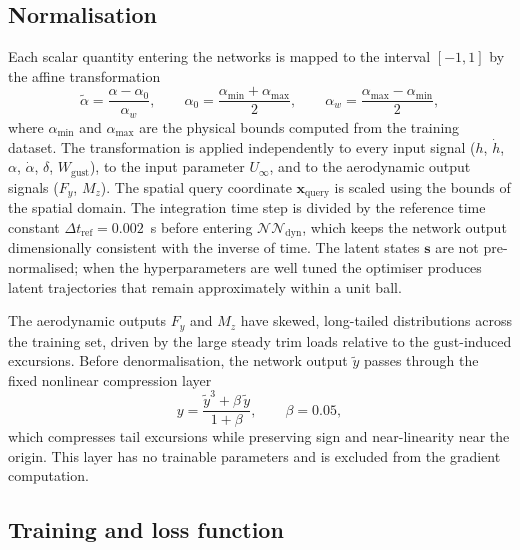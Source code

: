
\subsection{Normalisation}

Each scalar quantity entering the networks is mapped to the interval $[-1,1]$ by the
affine transformation
\begin{equation}
\tilde{\alpha} = \frac{\alpha - \alpha_0}{\alpha_w}, \qquad
\alpha_0 = \frac{\alpha_{\min}+\alpha_{\max}}{2}, \qquad
\alpha_w  = \frac{\alpha_{\max}-\alpha_{\min}}{2},
\label{eq:norm_affine}
\end{equation}
where $\alpha_{\min}$ and $\alpha_{\max}$ are the physical bounds computed from the training
dataset. The transformation is applied independently to every input signal ($h$, $\dot{h}$,
$\alpha$, $\dot{\alpha}$, $\delta$, $W_\mathrm{gust}$), to the input parameter $U_\infty$,
and to the aerodynamic output signals ($F_y$, $M_z$). The spatial query coordinate
$\mathbf{x}_\mathrm{query}$ is scaled using the bounds of the spatial domain. The
integration time step is divided by the reference time constant
$\Delta t_\mathrm{ref} = 0.002$~s before entering $\mathcal{NN}_\mathrm{dyn}$, which keeps
the network output dimensionally consistent with the inverse of time. The latent states
$\mathbf{s}$ are not pre-normalised; when the hyperparameters are well tuned the optimiser
produces latent trajectories that remain approximately within a unit ball.

The aerodynamic outputs $F_y$ and $M_z$ have skewed, long-tailed distributions across the
training set, driven by the large steady trim loads relative to the gust-induced excursions.
Before denormalisation, the network output $\tilde{y}$ passes through the fixed nonlinear
compression layer
\begin{equation}
y = \frac{\tilde{y}^3 + \beta\,\tilde{y}}{1+\beta}, \qquad \beta = 0.05,
\label{eq:nl_layer}
\end{equation}
which compresses tail excursions while preserving sign and near-linearity near the origin.
This layer has no trainable parameters and is excluded from the gradient computation.

\subsection{Training and loss function}

